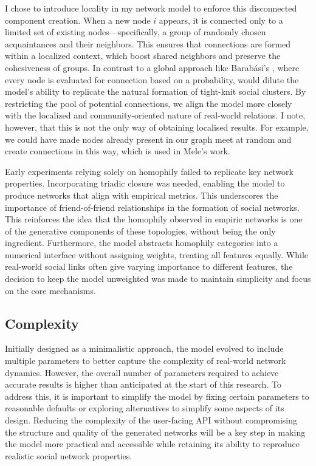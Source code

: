 \documentclass[runningheads]{llncs}
\begin{document}
I chose to introduce locality in my network model to enforce this disconnected component creation. When a new node $i$ appears, it is connected only to a limited set of existing nodes—specifically, a group of randomly chosen acquaintances and their neighbors. This ensures that connections are formed within a localized context, which boost shared neighbors and preserve the cohesiveness of groups. In contrast to a global approach like Barabási's \cite{barabasi1999emergence}, where every node is evaluated for connection based on a probability, would dilute the model's ability to replicate the natural formation of tight-knit social clusters. By restricting the pool of potential connections, we align the model more closely with the localized and community-oriented nature of real-world relations.
I note, however, that this is not the only way of obtaining localised results. For example, we could have made nodes already present in our graph meet at random and create connections in this way, which is used in Mele's \cite{mele2021structural} work.

Early experiments relying solely on homophily failed to replicate key network properties. Incorporating triadic closure was needed, enabling the model to produce networks that align with empirical metrics. This underscores the importance of friend-of-friend relationships in the formation of social networks. 
This reinforces the idea that the homophily observed in empiric networks is one of the generative components of these topologies, without being the only ingredient.
Furthermore, the model abstracts homophily categories into a numerical interface without assigning weights, treating all features equally. While real-world social links often give varying importance to different features, the decision to keep the model unweighted was made to maintain simplicity and focus on the core mechanisms.

\subsection{Complexity}
Initially designed as a minimalistic approach, the model evolved to include multiple parameters to better capture the complexity of real-world network dynamics. However, the overall number of parameters required to achieve accurate results is higher than anticipated at the start of this research. To address this, it is important to simplify the model by fixing certain parameters to reasonable defaults or exploring alternatives to simplify some aspects of its design. Reducing the complexity of the user-facing API without compromising the structure and quality of the generated networks will be a key step in making the model more practical and accessible while retaining its ability to reproduce realistic social network properties.
\end{document}
